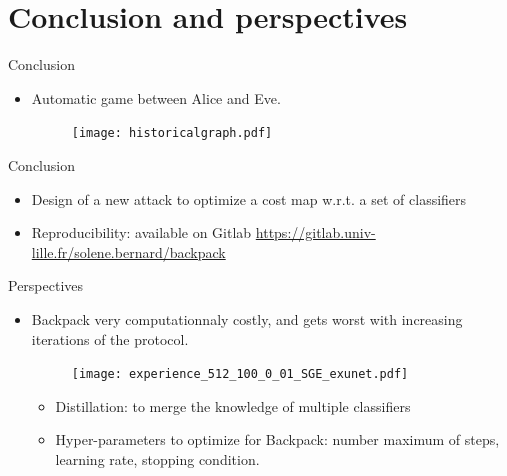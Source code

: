 \documentclass[10pt,aspectratio=169]{beamer}
\begin{document}
\section{Conclusion and perspectives}


\begin{frame}{Conclusion}
    \begin{itemize}
        \item Automatic game between Alice and Eve. 
        \begin{figure}[h]
            \texttt{[image: historicalgraph.pdf]}
        \end{figure}
    \end{itemize}
\end{frame}

\begin{frame}{Conclusion}
    \begin{itemize}
        \setlength\itemsep{2em}
        \item Design of a new attack to optimize a cost map w.r.t. a set of classifiers
        \pause
        \item Reproducibility: available on Gitlab \url{https://gitlab.univ-lille.fr/solene.bernard/backpack}
    \end{itemize}
\end{frame}


\begin{frame}{Perspectives}

    \begin{itemize}

        \item Backpack very computationnaly costly, and gets worst with increasing iterations of the protocol. 
        
        \begin{figure}[h]
            \texttt{[image: experience\_512\_100\_0\_01\_SGE\_exunet.pdf]}
        \end{figure}

        \pause

        \begin{itemize}
            \item Distillation: to merge the knowledge of multiple classifiers
            \item Hyper-parameters to optimize for Backpack: number maximum of steps, learning rate, stopping condition.
        \end{itemize}

    \end{itemize}

\end{frame}
\end{document}
